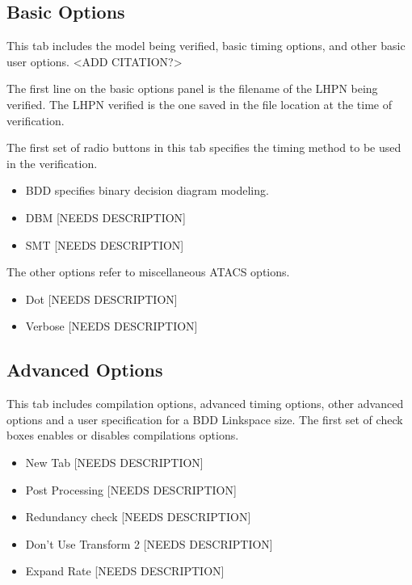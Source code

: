 \documentclass[titlepage,11pt]{article}
\begin{document}
\subsection{\label{basOptions}Basic Options}

\noindent
This tab includes the model being verified, basic timing options, and other
basic user options.
<ADD CITATION?> 

The first line on the basic options panel is the filename of the LHPN being
verified.  The LHPN verified is the one saved in the file location at the time
of verification.

The first set of radio buttons in this tab specifies the
timing method to be used in the verification.
\begin{itemize}
\item BDD specifies binary decision diagram modeling.
\item DBM [NEEDS DESCRIPTION]
\item SMT [NEEDS DESCRIPTION]
\end{itemize}

The other options refer to miscellaneous ATACS options.
\begin{itemize}
\item Dot [NEEDS DESCRIPTION]
\item Verbose [NEEDS DESCRIPTION]
\end{itemize}

\subsection{\label{advOptions}Advanced Options}

\noindent
This tab includes compilation options, advanced timing options, other advanced
options and a user specification for a BDD Linkspace size.  The first set of
check boxes enables or disables compilations options.
\begin{itemize}
\item New Tab [NEEDS DESCRIPTION]
\item Post Processing [NEEDS DESCRIPTION]
\item Redundancy check [NEEDS DESCRIPTION]
\item Don't Use Transform 2 [NEEDS DESCRIPTION]
\item Expand Rate [NEEDS DESCRIPTION]
\end{itemize}
\end{document}
